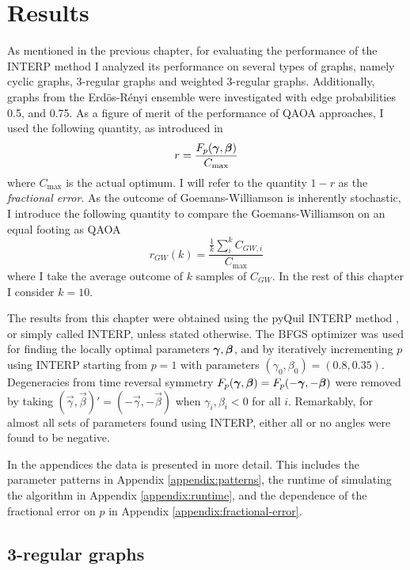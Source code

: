\chapter{Results}
\label{chap:results}
As mentioned in the previous chapter, for evaluating the performance of the INTERP method I analyzed its performance on several types of graphs, namely cyclic graphs, 3-regular graphs and weighted 3-regular graphs. Additionally, graphs from the Erd\"os-R\'enyi ensemble were investigated with edge probabilities 0.5, and 0.75. As a figure of merit of the performance of QAOA approaches, I used the following quantity, as introduced in \cite{ZWCPL18}
\begin{equation}
	r = \frac{F_p(\bm{\gamma},\bm{\beta})}{C_{\max}}
\end{equation}
where $C_{\max}$ is the actual optimum. I will refer to the quantity $1-r$ as the \emph{fractional error}. As the outcome of Goemans-Williamson is inherently stochastic, I introduce the following quantity to compare the Goemans-Williamson on an equal footing as QAOA
\begin{equation}
	r_{GW}(k) = \frac{\frac{1}{k}\sum_i^kC_{GW,i}}{C_{\max}}
\end{equation}
where I take the average outcome of $k$ samples of $C_{GW}$. In the rest of this chapter I consider $k=10$.

The results from this chapter were obtained using the pyQuil INTERP method \cite{pyQuil-INTERP}, or simply called INTERP, unless stated otherwise. The BFGS optimizer was used for finding the locally optimal parameters $\bm{\gamma},\bm{\beta}$, and by iteratively incrementing $p$ using INTERP starting from $p=1$ with parameters $(\gamma_0, \beta_0) = (0.8, 0.35)$. Degeneracies from time reversal symmetry $F_p(\bm{\gamma},\bm{\beta}) = F_p(-\bm{\gamma},-\bm{\beta})$ were removed by taking $(\vec{\gamma},\vec{\beta})' = (-\vec{\gamma},-\vec{\beta})$ when $\gamma_i,\beta_i < 0$ for all $i$. Remarkably, for almost all sets of parameters found using INTERP, either all or no angles were found to be negative.

In the appendices the data is presented in more detail. This includes the parameter patterns in Appendix \ref{appendix:patterns}, the runtime of simulating the algorithm in Appendix \ref{appendix:runtime}, and the dependence of the fractional error on $p$ in Appendix \ref{appendix:fractional-error}.

\section{3-regular graphs}

